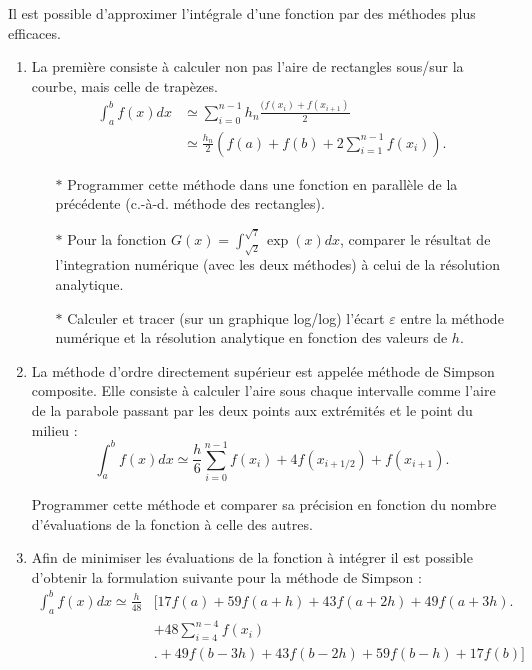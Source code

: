 Il est possible d'approximer l'intégrale d'une fonction par des
méthodes plus efficaces.
\begin{enumerate}
\item La  première consiste  à calculer non  pas l'aire  de rectangles
  sous/sur la courbe, mais celle de trapèzes.
  \begin{equation}
    \begin{split}
      \int_a^b        f(x)dx       &\simeq        \sum_{i=0}^{n-1}       h_n
      \frac{(f(x_i)+f(x_{i+1})}{2}\\ &\simeq \frac{h_n}{2} \left(f(a)+f(b) +
      2\sum_{i=1}^{n-1} f(x_i) \right).
    \end{split}
  \end{equation}
  \begin{itemize}
  \item[$\ast$] Programmer  cette  méthode dans une fonction en parallèle de la précédente
    (c.-à-d. méthode des rectangles).
  \item[$\ast$] Pour la fonction $G(x) = \int_{\sqrt{2}}^{\sqrt{7}} \exp(x) dx$, 
    comparer le résultat de l'integration numérique (avec les deux méthodes) à celui de la résolution analytique.
  \item[$\ast$] Calculer et tracer (sur  un graphique  log/log) l'écart $\varepsilon$ entre la méthode numérique
    et la résolution analytique en   fonction  des  valeurs   de  $h$.
  \end{itemize}


\item La méthode d'ordre directement  supérieur est appelée méthode de
  Simpson  composite.  Elle  consiste  à calculer  l'aire sous  chaque
  intervalle comme l'aire  de la parabole passant par  les deux points
  aux extrémités et le point du milieu :
  \begin{equation}
    \int_a^b   f(x)dx  \simeq   \frac{h}{6}\sum_{i=0}^{n-1}  f(x_i)   +  4
    f(x_{i+1/2}) + f(x_{i+1}) .
  \end{equation}

  Programmer  cette méthode  et  comparer sa  précision  en fonction  du
  nombre d'évaluations de la fonction à celle des autres.
\item  Afin de minimiser les évaluations de la fonction à intégrer il est 
possible d'obtenir la formulation suivante pour la méthode de Simpson : 
 \begin{equation}
\begin{split}
\int_a^b  f(x)dx   \simeq  \frac{h}{48}  &\biggl[17f(a)   +  59f(a+h)+
  43f(a+2h)+
  49f(a+3h)\biggr.\\ &+48\sum_{i=4}^{n-4}f(x_i)\\ &\biggl.+49f(b-3h)+43f(b-2h)+59f(b-h)+17f(b)\biggr]
\end{split}
 \end{equation}
 

\end{enumerate}
